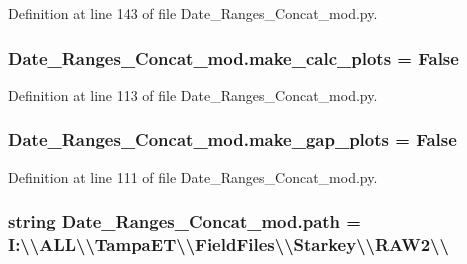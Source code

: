Definition at line 143 of file Date\+\_\+\+Ranges\+\_\+\+Concat\+\_\+mod.\+py.

\hypertarget{namespace_date___ranges___concat__mod_ade5d373c30911b73d8e99d06c3da1645}{}
\subsubsection[{make\+\_\+calc\+\_\+plots}]{\setlength{\rightskip}{0pt plus 5cm}Date\+\_\+\+Ranges\+\_\+\+Concat\+\_\+mod.\+make\+\_\+calc\+\_\+plots = False}\label{namespace_date___ranges___concat__mod_ade5d373c30911b73d8e99d06c3da1645}


Definition at line 113 of file Date\+\_\+\+Ranges\+\_\+\+Concat\+\_\+mod.\+py.

\hypertarget{namespace_date___ranges___concat__mod_a57a0f5655be4ce75050567a5862c8dfb}{}
\subsubsection[{make\+\_\+gap\+\_\+plots}]{\setlength{\rightskip}{0pt plus 5cm}Date\+\_\+\+Ranges\+\_\+\+Concat\+\_\+mod.\+make\+\_\+gap\+\_\+plots = False}\label{namespace_date___ranges___concat__mod_a57a0f5655be4ce75050567a5862c8dfb}


Definition at line 111 of file Date\+\_\+\+Ranges\+\_\+\+Concat\+\_\+mod.\+py.

\hypertarget{namespace_date___ranges___concat__mod_a22267529906f1108c44c7fe2c252d206}{}
\subsubsection[{path}]{\setlength{\rightskip}{0pt plus 5cm}string Date\+\_\+\+Ranges\+\_\+\+Concat\+\_\+mod.\+path = \textquotesingle{}I\+:\textbackslash{}\textbackslash{}\+A\+L\+L\textbackslash{}\textbackslash{}\+Tampa\+E\+T\textbackslash{}\textbackslash{}\+Field\+Files\textbackslash{}\textbackslash{}\+Starkey\textbackslash{}\textbackslash{}\+R\+A\+W2\textbackslash{}\textbackslash{}\textquotesingle{}}\label{namespace_date___ranges___concat__mod_a22267529906f1108c44c7fe2c252d206}


